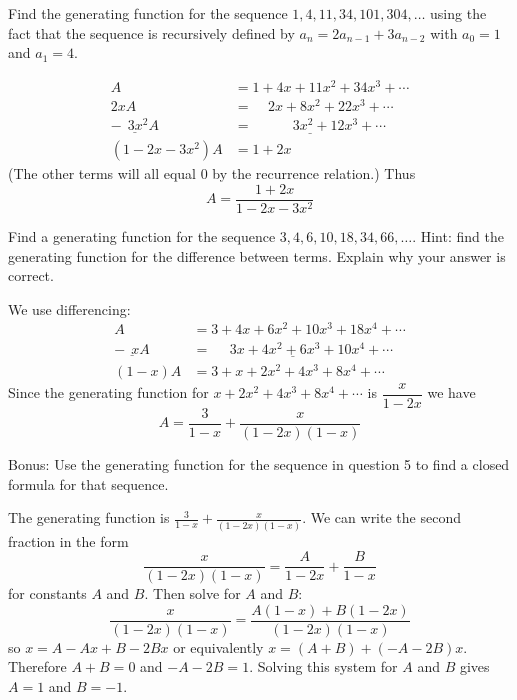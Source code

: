 \documentclass[11pt]{exam}
\def\d{\displaystyle}
\begin{document}
\begin{questions}


\question[4] Find the generating function for the sequence $1, 4, 11, 34, 101, 304, \ldots$ using the fact that the sequence is recursively defined by $a_n = 2 a_{n-1} + 3a_{n-2}$ with $a_0 = 1$ and $a_1 = 4$.  

\begin{solution}
  \begin{align*}
    A & = 1 + 4x + 11x^2 + 34x^3 + \cdots \\
    2xA & = ~~~~~ 2x + 8x^2 + 22x^3 + \cdots \\
    \underline{- ~~ 3x^2A } & \underline{ = ~~~~~~~~~~~~~3x^2 + 12x^3 + \cdots} \\
    (1-2x-3x^2)A & = 1 + 2x
  \end{align*}
(The other terms will all equal 0 by the recurrence relation.)  Thus
\[A = \frac{1+2x}{1-2x-3x^2}\]
\end{solution}


\question[4] Find a generating function for the sequence $3, 4, 6, 10, 18, 34, 66, \ldots$.  Hint: find the generating function for the difference between terms. Explain why your answer is correct.
\begin{solution}
We use differencing:
  \begin{align*}
    A & = 3 + 4x + 6x^2 + 10x^3 + 18x^4 + \cdots \\
    \underline{ - ~~xA } & \underline{ = ~~~~~~ 3x + 4x^2 + 6x^3 + 10x^4 + \cdots }\\
    (1-x)A & = 3 + x + 2x^2 + 4x^3 + 8x^4 + \cdots
  \end{align*}
  Since the generating function for $x + 2x^2 + 4x^3 + 8x^4 + \cdots$ is $\dfrac{x}{1-2x}$ we have
  \[A = \frac{3}{1-x} + \frac{x}{(1-2x)(1-x)}\]
\end{solution}


\bonusquestion[4] Bonus: Use the generating function for the sequence in question 5 to find a closed formula for that sequence.
\begin{solution}
  The generating function is $\d\frac{3}{1-x} + \frac{x}{(1-2x)(1-x)}$.  We can write the second fraction in the form 
  \[\frac{x}{(1-2x)(1-x)} = \frac{A}{1-2x} + \frac{B}{1-x}\]
  for constants $A$ and $B$.  Then solve for $A$ and $B$:
  \[\frac{x}{(1-2x)(1-x)} = \frac{A(1-x) + B(1-2x)}{(1-2x)(1-x)}\]
  so $x = A - Ax + B - 2Bx$ or equivalently $x = (A+B) +(-A -2B)x$.  Therefore $A + B = 0$ and $-A -2B = 1$.  Solving this system for $A$ and $B$ gives $A = 1$ and $B = -1$.  
  

\end{solution}
\end{questions}
\end{document}
